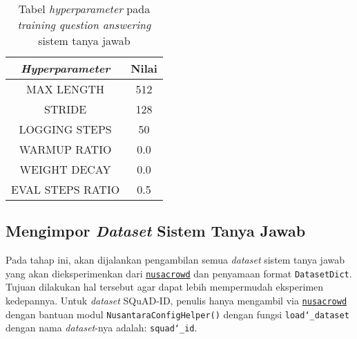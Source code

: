 \begin{table}[h]
\centering
\begin{tabular}{||c | c||} 
 \hline\hline
 \emph{Hyperparameter} & Nilai \\ [0.5ex] 
 \hline\hline
 MAX LENGTH & 512 \\ 
 STRIDE & 128 \\
 LOGGING STEPS & 50 \\
 WARMUP RATIO & 0.0 \\
 WEIGHT DECAY & 0.0 \\ 
 EVAL STEPS RATIO & 0.5 \\ [1ex] 
 \hline\hline
\end{tabular}
\caption{Tabel \emph{hyperparameter} pada \emph{training question answering} sistem tanya jawab}
\end{table}

\subsection{Mengimpor \emph{Dataset} Sistem Tanya Jawab}
Pada tahap ini, akan dijalankan pengambilan semua \emph{dataset} sistem tanya jawab yang akan dieksperimenkan dari \href{https://github.com/IndoNLP/nusa-crowd/tree/master/nusacrowd/nusa_datasets/}{\texttt{nusacrowd}} dan penyamaan format \texttt{DatasetDict}. Tujuan dilakukan hal tersebut agar dapat lebih mempermudah eksperimen kedepannya. Untuk \emph{dataset} SQuAD-ID, penulis hanya mengambil via \href{https://github.com/IndoNLP/nusa-crowd/tree/master/nusacrowd/nusa_datasets/}{\texttt{nusacrowd}} dengan bantuan modul \texttt{NusantaraConfigHelper()} dengan fungsi \texttt{load\char`_dataset} dengan nama \emph{dataset}-nya adalah: \texttt{squad\char`_id}. 

